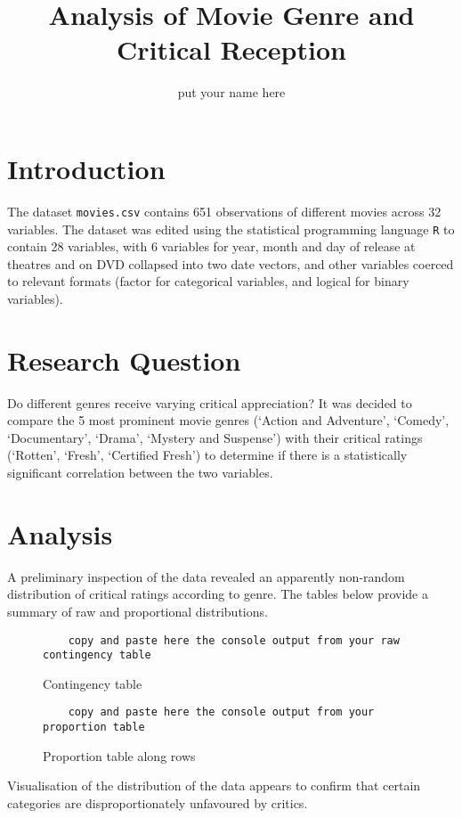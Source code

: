 \documentclass[12pt,a4paper]{article}
\author{put your name here}
\title{Analysis of Movie Genre and Critical Reception}
\begin{document}
	\maketitle
	
	\section*{Introduction}
	The dataset {\tt movies.csv} contains 651 observations of different movies across 32 variables. The dataset was edited using the statistical programming language {\tt R} to contain 28 variables, with 6 variables for year, month and day of release at theatres and on DVD collapsed into two date vectors, and other variables coerced to relevant formats (factor for categorical variables, and logical for binary variables). 
	
	\section*{Research Question}
	Do different genres receive varying critical appreciation? It was decided to compare the 5 most prominent movie genres (`Action and Adventure', `Comedy', `Documentary', `Drama', `Mystery and Suspense') with their critical ratings (`Rotten', `Fresh', `Certified Fresh') to determine if there is a statistically significant correlation between the two variables.
	
	\section*{Analysis}
	A preliminary inspection of the data revealed an apparently non-random distribution of critical ratings according to genre. The tables below provide a summary of raw and proportional distributions.
	\begin{figure}
			\begin{verbatim}
	copy and paste here the console output from your raw contingency table
			\end{verbatim}
		\caption{\footnotesize Contingency table}
	\end{figure}
	\begin{figure}
			\begin{verbatim}
	copy and paste here the console output from your proportion table
			\end{verbatim}
		\caption{\footnotesize Proportion table along rows}
	\end{figure}

Visualisation of the distribution of the data appears to confirm that certain categories are disproportionately unfavoured by critics.
\end{document}
